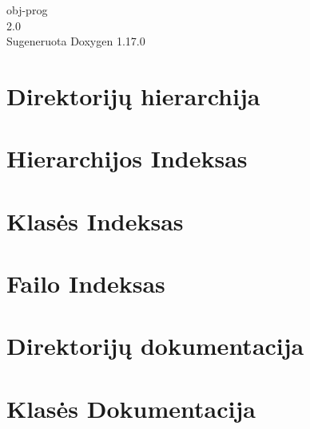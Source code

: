 \documentclass[twoside]{book}
\newcommand{\+}{\discretionary{\mbox{\scriptsize$\hookleftarrow$}}{}{}}
\newcommand{\clearemptydoublepage}{%
    \newpage{\pagestyle{empty}\cleardoublepage}%
  }
\begin{document}
  \raggedbottom
    \hypersetup{pageanchor=false,
                bookmarksnumbered=true,
                pdfencoding=unicode
               }
  \begin{titlepage}
  \vspace*{7cm}
  \begin{center}%
  {\Large obj-\/prog}\\
  [1ex]\large 2.\+0 \\
  \vspace*{1cm}
  {\large Sugeneruota Doxygen 1.17.0}\\
  \end{center}
  \end{titlepage}
  \clearemptydoublepage
  \tableofcontents
  \clearemptydoublepage
  \hypersetup{pageanchor=true}

\chapter{Direktorijų hierarchija}

\chapter{Hierarchijos Indeksas}

\chapter{Klasės Indeksas}

\chapter{Failo Indeksas}

\chapter{Direktorijų dokumentacija}

\chapter{Klasės Dokumentacija}



\end{document}
